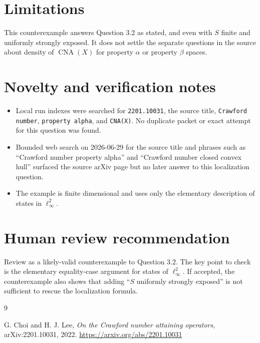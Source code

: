 \documentclass[11pt]{amsart}
\theoremstyle{remark}
\newcommand{\CNA}{\operatorname{CNA}}
\begin{document}
\section*{Limitations}

This counterexample answers Question 3.2 as stated, and even with $S$ finite
and uniformly strongly exposed.  It does not settle the separate questions in
the source about density of $\CNA(X)$ for property $\alpha$ or property
$\beta$ spaces.

\section*{Novelty and verification notes}

\begin{itemize}[leftmargin=*]
\item Local run indexes were searched for \texttt{2201.10031}, the source
title, \texttt{Crawford number}, \texttt{property alpha}, and
\texttt{CNA(X)}.  No duplicate packet or exact attempt for this question was
found.
\item Bounded web search on 2026-06-29 for the source title and phrases such
as ``Crawford number property alpha'' and ``Crawford number closed convex
hull'' surfaced the source arXiv page but no later answer to this localization
question.
\item The example is finite dimensional and uses only the elementary
description of states in $\ell_\infty^2$.
\end{itemize}

\section*{Human review recommendation}

Review as a likely-valid counterexample to Question 3.2.  The key point to
check is the elementary equality-case argument for states of $\ell_\infty^2$.
If accepted, the counterexample also shows that adding ``$S$ uniformly strongly
exposed'' is not sufficient to rescue the localization formula.

\begin{thebibliography}{9}

G. Choi and H. J. Lee,
\emph{On the Crawford number attaining operators},
arXiv:2201.10031, 2022.
\url{https://arxiv.org/abs/2201.10031}

\end{thebibliography}
\end{document}
